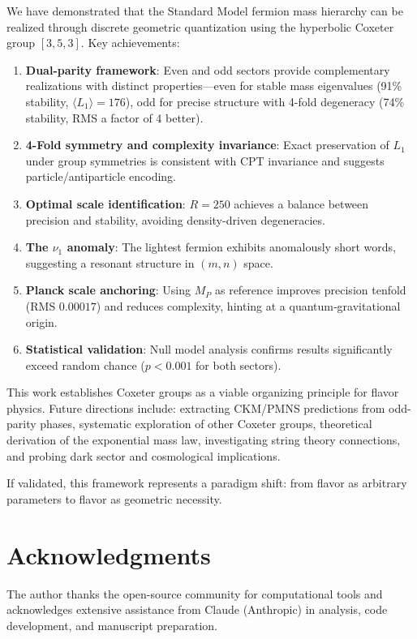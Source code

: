 \documentclass[11pt,a4paper]{article}
\newcommand{\tgrp}{\ensuremath{[3,5,3]}}
\begin{document}
We have demonstrated that the Standard Model fermion mass hierarchy can be realized through discrete geometric quantization using the hyperbolic Coxeter group \tgrp. Key achievements:

\begin{enumerate}
\item \textbf{Dual-parity framework}: Even and odd sectors provide complementary realizations with distinct properties—even for stable mass eigenvalues (91\% stability, $\langle L_1 \rangle = 176$), odd for precise structure with 4-fold degeneracy (74\% stability, RMS a factor of 4 better).
\item \textbf{4-Fold symmetry and complexity invariance}: Exact preservation of $L_1$ under group symmetries is consistent with CPT invariance and suggests particle/antiparticle encoding.
\item \textbf{Optimal scale identification}: $R=250$ achieves a balance between precision and stability, avoiding density-driven degeneracies.
\item \textbf{The $\nu_1$ anomaly}: The lightest fermion exhibits anomalously short words, suggesting a resonant structure in $(m,n)$ space.
\item \textbf{Planck scale anchoring}: Using $M_P$ as reference improves precision tenfold (RMS $0.00017$) and reduces complexity, hinting at a quantum‑gravitational origin.
\item \textbf{Statistical validation}: Null model analysis confirms results significantly exceed random chance ($p<0.001$ for both sectors).
\end{enumerate}

This work establishes Coxeter groups as a viable organizing principle for flavor physics. Future directions include: extracting CKM/PMNS predictions from odd-parity phases, systematic exploration of other Coxeter groups, theoretical derivation of the exponential mass law, investigating string theory connections, and probing dark sector and cosmological implications.

If validated, this framework represents a paradigm shift: from flavor as arbitrary parameters to flavor as geometric necessity.

\section*{Acknowledgments}

The author thanks the open-source community for computational tools and acknowledges extensive assistance from Claude (Anthropic) in analysis, code development, and manuscript preparation.
\end{document}
